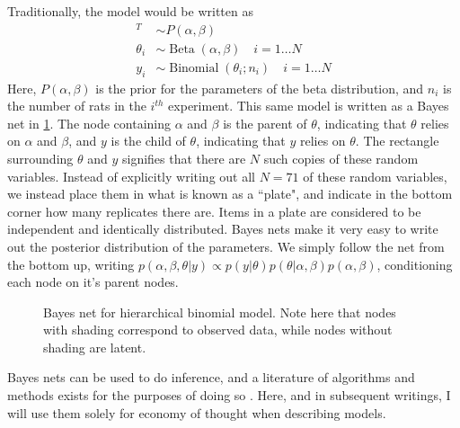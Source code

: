 Traditionally, the model would be written as 
%
\begin{align*}
	[\alpha,\beta]^T &\sim P(\alpha, \beta) \\
	\theta_i &\sim \operatorname{Beta}(\alpha,\beta) \quad i = 1 \dots N\\
	y_i &\sim \operatorname{Binomial}(\theta_i ; n_i) \quad i = 1 \dots N
	\end{align*}
%
Here, $ P(\alpha, \beta)  $ is the prior for the parameters of the beta distribution, and $ n_i $ is the number of rats in the $ i^{th} $ experiment.  This same model is written as a Bayes net in \cref{bayesnet}.   The node containing $ \alpha $ and $ \beta $ is the parent of $ \theta $, indicating that $ \theta $ relies on $ \alpha $ and $ \beta $, and $ y $ is the child of $ \theta $, indicating that $ y $ relies on $ \theta $.  The rectangle surrounding $ \theta $ and $ y $ signifies that there are $ N $ such copies of these random variables.  Instead of explicitly writing out all $ N=71 $ of these random variables, we instead place them in what is known as a ``plate", and indicate in the bottom corner how many replicates there are.  Items in a plate are considered to be independent and identically distributed.  Bayes nets make it very easy to write out the posterior distribution of the parameters.  We simply follow the net from the bottom up, writing $ p(\alpha,\beta, \theta \vert y) \propto p(y\vert \theta)p(\theta \vert \alpha, \beta)p(\alpha,\beta) $, conditioning each node on it's parent nodes.

\begin{figure}[h!]

	\centering
	\caption{Bayes net for hierarchical binomial model.  Note here that nodes with shading correspond to observed data, while nodes without shading are latent.}
	\label{bayesnet}
\end{figure}

Bayes nets can be used to do inference, and a literature of algorithms and methods exists for the purposes of doing so \cite{Bishop2006pattern,koller2009probabilistic}.  Here, and in subsequent writings, I will use them solely for economy of thought when describing models.


